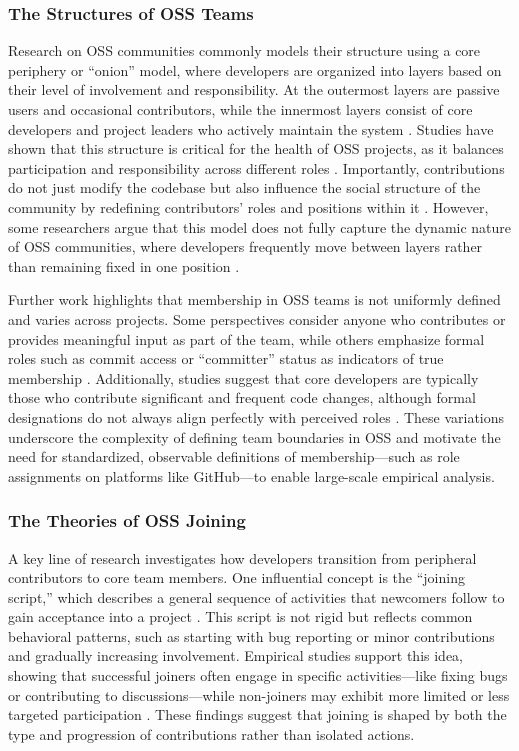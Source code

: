 \subsubsection{The Structures of OSS Teams}
Research on OSS communities commonly models their structure using a core periphery or “onion” model, where developers are organized into layers based on their level of involvement and responsibility. At the outermost layers are passive users and occasional contributors, while the innermost layers consist of core developers and project leaders who actively maintain the system \cite{1_Nakakoji2003}. Studies have shown that this structure is critical for the health of OSS projects, as it balances participation and responsibility across different roles \cite{6_Mockus2002,7_Dinh2005}. Importantly, contributions do not just modify the codebase but also influence the social structure of the community by redefining contributors' roles and positions within it \cite{1_Nakakoji2003}. However, some researchers argue that this model does not fully capture the dynamic nature of OSS communities, where developers frequently move between layers rather than remaining fixed in one position \cite{8_Ducheneaut2005}.

Further work highlights that membership in OSS teams is not uniformly defined and varies across projects. Some perspectives consider anyone who contributes or provides meaningful input as part of the team, while others emphasize formal roles such as commit access or “committer” status as indicators of true membership \cite{11_Vasilescu2015,9_Shah2006}. Additionally, studies suggest that core developers are typically those who contribute significant and frequent code changes, although formal designations do not always align perfectly with perceived roles \cite{12_Souza2005,13_Crowston2017,14_Joblin2016}. These variations underscore the complexity of defining team boundaries in OSS and motivate the need for standardized, observable definitions of membership—such as role assignments on platforms like GitHub—to enable large-scale empirical analysis.

\subsubsection{The Theories of OSS Joining}
A key line of research investigates how developers transition from peripheral contributors to core team members. One influential concept is the “joining script,” which describes a general sequence of activities that newcomers follow to gain acceptance into a project \cite{15_vonKrogh2003}. This script is not rigid but reflects common behavioral patterns, such as starting with bug reporting or minor contributions and gradually increasing involvement. Empirical studies support this idea, showing that successful joiners often engage in specific activities—like fixing bugs or contributing to discussions—while non-joiners may exhibit more limited or less targeted participation \cite{16_SinhaMS11}. These findings suggest that joining is shaped by both the type and progression of contributions rather than isolated actions.

